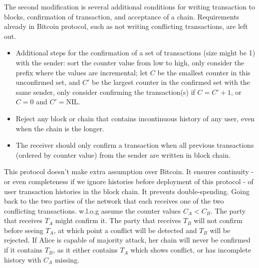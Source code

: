 \documentclass[10pt]{article}
\begin{document}
The second modification is several additional conditions for writing transaction
to blocks, confirmation of transaction, and acceptance of a chain. Requirements
already in Bitcoin protocol, such as not writing conflicting transactions, are
left out.

\begin{itemize}
    \item Additional steps for the confirmation of a set of transactions (size
    might be 1) with the sender: sort the counter value from low to high, only
    consider the prefix where the values are incremental; let $C$ be the
    smallest counter in this unconfirmed set, and $C'$ be the largest counter in
    the confirmed set with the same sender, only consider confirming the
    transaction(s) if $C = C' + 1$, or $C=0$ and $C'=\text{NIL}$.
    \item Reject any block or chain that contains incontinuous history of any
    user, even when the chain is the longer.
    \item The receiver should only confirm a transaction when all previous
    transactions (ordered by counter value) from the sender are written in block
    chain.
\end{itemize}

This protocol doesn't make extra assumption over Bitcoin. It ensures continuity
- or even completeness if we ignore histories before deployment of this
protocol - of user transaction histories in the block chain. It prevents
double-spending. Going back to the two parties of the network that each receives
one of the two conflicting transactions. w.l.o.g assume the counter values
$C_A < C_B$. The party that receives $T_A$ might confirm it. The party that
receives $T_B$ will not confirm before seeing $T_A$, at which point a conflict
will be detected and $T_B$ will be rejected.
If Alice is capable of majority attack, her chain will never be confirmed if it
contains $T_B$, as it either contains $T_A$ which shows conflict, or has
incomplete history with $C_A$ missing.
\end{document}
